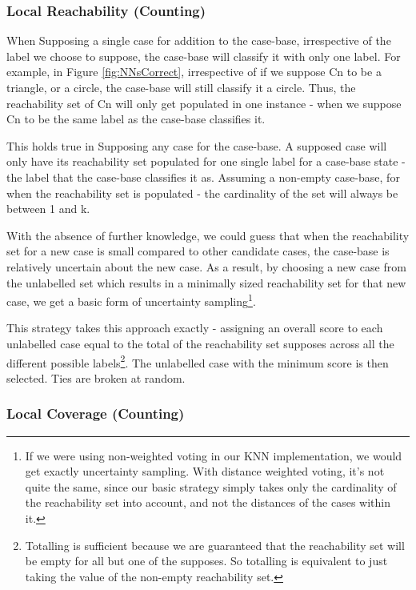 \documentclass[a4paper,11pt]{report}
\begin{document}
\subsubsection{Local Reachability (Counting)\label{sec:compstrat1}}
When Supposing a single case for addition to the case-base, irrespective of the label we choose to suppose, the case-base will classify it with only one label. For example, in Figure \ref{fig:NNsCorrect}, irrespective of if we suppose Cn to be a triangle, or a circle, the case-base will still classify it a circle. Thus, the reachability set of Cn will only get populated in one instance - when we suppose Cn to be the same label as the case-base classifies it.

This holds true in Supposing any case for the case-base. A supposed case will only have its reachability set populated for one single label for a case-base state - the label that the case-base classifies it as. Assuming a non-empty case-base, for when the reachability set is populated - the cardinality of the set will always be between 1 and k.

With the absence of further knowledge, we could guess that when the reachability set for a new case is small compared to other candidate cases, the case-base is relatively uncertain about the new case. As a result, by choosing a new case from the unlabelled set which results in a minimally sized reachability set for that new case, we get a basic form of uncertainty sampling\footnote{If we were using non-weighted voting in our KNN implementation, we would get exactly uncertainty sampling. With distance weighted voting, it's not quite the same, since our basic strategy simply takes only the cardinality of the reachability set into account, and not the distances of the cases within it.}.

This strategy takes this approach exactly - assigning an overall score to each unlabelled case equal to the total of the reachability set supposes across all the different possible labels\footnote{Totalling is sufficient because we are guaranteed that the reachability set will be empty for all but one of the supposes. So totalling is equivalent to just taking the value of the non-empty reachability set.}. The unlabelled case with the minimum score is then selected. Ties are broken at random.

\subsubsection{Local Coverage (Counting)}
\end{document}
